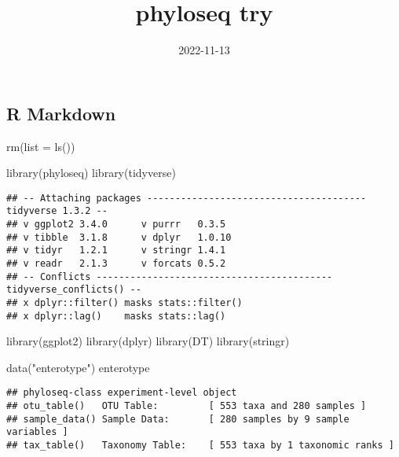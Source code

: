 \documentclass[
]{article}
\title{phyloseq try}
\author{}
\date{\vspace{-2.5em}2022-11-13}
\newenvironment{Shaded}{\begin{snugshade}}{\end{snugshade}}
\newcommand{\AttributeTok}[1]{\textcolor[rgb]{0.77,0.63,0.00}{#1}}
\newcommand{\FunctionTok}[1]{\textcolor[rgb]{0.00,0.00,0.00}{#1}}
\newcommand{\NormalTok}[1]{#1}
\newcommand{\StringTok}[1]{\textcolor[rgb]{0.31,0.60,0.02}{#1}}
\begin{document}
\maketitle

\hypertarget{r-markdown}{%
\subsection{R Markdown}\label{r-markdown}}

\begin{Shaded}
\begin{Highlighting}[]
\FunctionTok{rm}\NormalTok{(}\AttributeTok{list =} \FunctionTok{ls}\NormalTok{())}
\end{Highlighting}
\end{Shaded}

\begin{Shaded}
\begin{Highlighting}[]
\FunctionTok{library}\NormalTok{(phyloseq)}
\FunctionTok{library}\NormalTok{(tidyverse)}
\end{Highlighting}
\end{Shaded}

\begin{verbatim}
## -- Attaching packages --------------------------------------- tidyverse 1.3.2 --
## v ggplot2 3.4.0      v purrr   0.3.5 
## v tibble  3.1.8      v dplyr   1.0.10
## v tidyr   1.2.1      v stringr 1.4.1 
## v readr   2.1.3      v forcats 0.5.2 
## -- Conflicts ------------------------------------------ tidyverse_conflicts() --
## x dplyr::filter() masks stats::filter()
## x dplyr::lag()    masks stats::lag()
\end{verbatim}

\begin{Shaded}
\begin{Highlighting}[]
\FunctionTok{library}\NormalTok{(ggplot2)}
\FunctionTok{library}\NormalTok{(dplyr)}
\FunctionTok{library}\NormalTok{(DT)}
\FunctionTok{library}\NormalTok{(stringr)}
\end{Highlighting}
\end{Shaded}

\begin{Shaded}
\begin{Highlighting}[]
\FunctionTok{data}\NormalTok{(}\StringTok{"enterotype"}\NormalTok{)}
\NormalTok{enterotype}
\end{Highlighting}
\end{Shaded}

\begin{verbatim}
## phyloseq-class experiment-level object
## otu_table()   OTU Table:         [ 553 taxa and 280 samples ]
## sample_data() Sample Data:       [ 280 samples by 9 sample variables ]
## tax_table()   Taxonomy Table:    [ 553 taxa by 1 taxonomic ranks ]
\end{verbatim}
\end{document}
